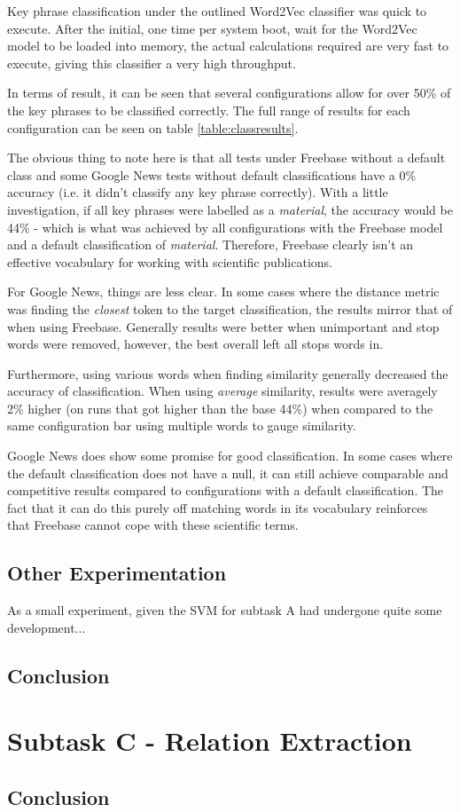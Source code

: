 Key phrase classification under the outlined Word2Vec classifier was quick to execute. After the initial, one time per system boot, wait for the Word2Vec model to be loaded into memory, the actual calculations required are very fast to execute, giving this classifier a very high throughput.

In terms of result, it can be seen that several configurations allow for over 50\% of the key phrases to be classified correctly. The full range of results for each configuration can be seen on table \ref{table:classresults}.

The obvious thing to note here is that all tests under Freebase without a default class and some Google News tests without default classifications have a 0\% accuracy (i.e. it didn't classify any key phrase correctly). With a little investigation, if all key phrases were labelled as a \textit{material}, the accuracy would be 44\% - which is what was achieved by all configurations with the Freebase model and a default classification of \textit{material}. Therefore, Freebase clearly isn't an effective vocabulary for working with scientific publications. 

For Google News, things are less clear. In some cases where the distance metric was finding the \textit{closest} token to the target classification, the results mirror that of when using Freebase. Generally results were better when unimportant and stop words were removed, however, the best overall left all stops words in.

Furthermore, using various words when finding similarity generally decreased the accuracy of classification. When using \textit{average} similarity, results were averagely 2\% higher (on runs that got higher than the base 44\%) when compared to the same configuration bar using multiple words to gauge similarity. 

Google News does show some promise for good classification. In some cases where the default classification does not have a null, it can still achieve comparable and competitive results compared to configurations with a default classification. The fact that it can do this purely off matching words in its vocabulary reinforces that Freebase cannot cope with these scientific terms. 



\subsection{Other Experimentation}
As a small experiment, given the SVM for subtask A had undergone quite some development...

\subsection{Conclusion}

\section{Subtask C - Relation Extraction}

\subsection{Conclusion}

